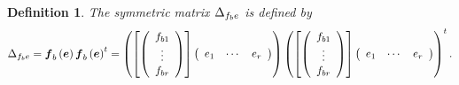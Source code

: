 \documentclass[aps,preprint]{revtex4}
\newtheorem{definition}[theorem]{Definition}
\begin{document}
\begin{definition}
The symmetric matrix ${\LARGE \Delta }_{f_{b}e}$ is defined by 
\begin{equation}
{\LARGE \Delta }_{f_{b}e}=\boldsymbol{f}_{b}\left( \boldsymbol{e}\right) 
\boldsymbol{f}_{b}\left( \boldsymbol{e}\right) ^{t}=\left( \left[ \left( 
\begin{array}{c}
f_{b1} \\ 
\vdots \\ 
f_{br}%
\end{array}%
\right) \right] \left( 
\begin{array}{ccc}
e_{1} & \cdots & e_{r}%
\end{array}%
\right) \right) \left( \left[ \left( 
\begin{array}{c}
f_{b1} \\ 
\vdots \\ 
f_{br}%
\end{array}%
\right) \right] \left( 
\begin{array}{ccc}
e_{1} & \cdots & e_{r}%
\end{array}%
\right) \right) ^{t}.
\end{equation}
\end{definition}
\end{document}
